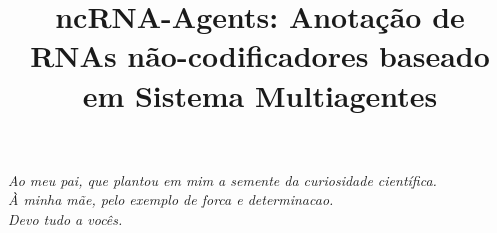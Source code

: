 \documentclass[doutorado]{unb-cic}
\title{ncRNA-Agents: Anotação de RNAs não-codificadores baseado em Sistema Multiagentes}
\begin{document}
  \maketitle
  \pretextual

  \begin{dedicatoria}
     \begin{flushright}
       \vfill
       \textit{Ao meu pai, que plantou em mim a semente da curiosidade científica.  \\	
       \vspace{3mm}
  	   À minha mãe, pelo exemplo de forca e determinacao.  \\	
       \vspace{3mm}
       Devo tudo a vocês.} 
      \end{flushright}
  \end{dedicatoria}
 
\end{document}
